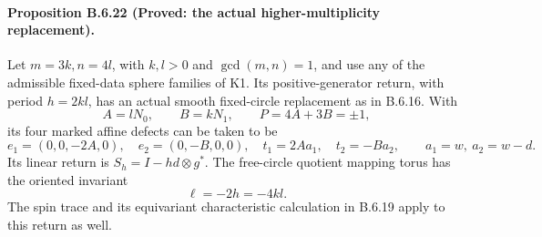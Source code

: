\paragraph{Proposition B.6.22 (Proved: the actual higher-multiplicity replacement).}
Let $m=3k,n=4l$, with $k,l>0$ and $\gcd(m,n)=1$, and use
any of the admissible fixed-data sphere families of K1.  Its
positive-generator return, with period $h=2kl$, has an actual
smooth fixed-circle replacement as in B.6.16.  With
\[
 A=lN_0,\qquad B=kN_1,\qquad P=4A+3B=\pm1,
\]
its four marked affine defects can be taken to be
\[
 e_1=(0,0,-2A,0),\quad e_2=(0,-B,0,0),\quad
 t_1=2A a_1,\quad t_2=-B a_2,
 \qquad a_1=w,\ a_2=w-d.
 \tag{B.6.39}
\]
Its linear return is $S_h=I-hd\otimes g^*$.  The free-circle
quotient mapping torus has the oriented invariant
\[
                           \ell=-2h=-4kl.
 \tag{B.6.40}
\]
The spin trace and its equivariant characteristic calculation
in B.6.19 apply to this return as well.
